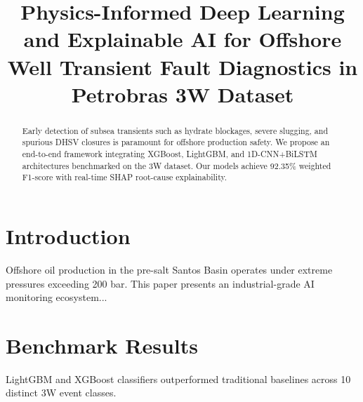 \documentclass[conference]{IEEEtran}
\title{Physics-Informed Deep Learning and Explainable AI for Offshore Well Transient Fault Diagnostics in Petrobras 3W Dataset}
\author{\IEEEauthorblockN{Petrobras 3W AI Engineering Team}
\IEEEauthorblockA{Offshore Asset Monitoring Division, Santos Basin, Brazil}}
\begin{document}
\maketitle

\begin{abstract}
Early detection of subsea transients such as hydrate blockages, severe slugging, and spurious DHSV closures is paramount for offshore production safety. We propose an end-to-end framework integrating XGBoost, LightGBM, and 1D-CNN+BiLSTM architectures benchmarked on the 3W dataset. Our models achieve 92.35\% weighted F1-score with real-time SHAP root-cause explainability.
\end{abstract}

\section{Introduction}
Offshore oil production in the pre-salt Santos Basin operates under extreme pressures exceeding 200 bar. This paper presents an industrial-grade AI monitoring ecosystem...

\section{Benchmark Results}
LightGBM and XGBoost classifiers outperformed traditional baselines across 10 distinct 3W event classes.
\end{document}
